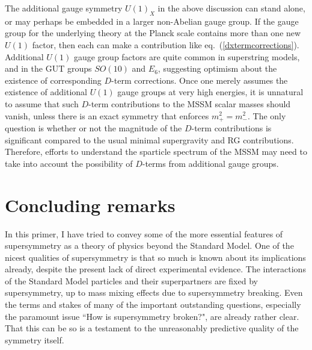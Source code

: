 \documentclass[12pt]{article}
\begin{document}
The additional gauge symmetry $U(1)_X$ in the above discussion can stand
alone, or may perhaps be embedded in a larger non-Abelian gauge group. If
the gauge group for the underlying theory at the Planck scale contains
more than one new $U(1)$ factor, then each can make a contribution like
eq.~(\ref{dxtermcorrections}). Additional $U(1)$ gauge group 
factors are quite
common in superstring models, and in the GUT groups $SO(10)$ and $E_6$, 
suggesting optimism about the existence of
corresponding $D$-term corrections. Once one merely assumes the existence
of additional $U(1)$ gauge groups at very high energies, it is unnatural
to assume that such $D$-term contributions to the MSSM scalar masses
should vanish, unless there is an exact symmetry that enforces $m_+^2 =
m_-^2$. The only question is whether or not the magnitude of the
$D$-term contributions is significant compared to the usual minimal
supergravity and RG contributions. Therefore, efforts to
understand the sparticle spectrum of the MSSM may need to take into
account the possibility of $D$-terms from additional gauge groups. 

\section{Concluding remarks}\label{sec:outlook}
\setcounter{equation}{0}
\setcounter{figure}{0}
\setcounter{table}{0}
\setcounter{footnote}{1}

In this primer, I have tried to convey some of the more essential 
features of supersymmetry as a theory of physics beyond the Standard Model. 
One of the nicest qualities of supersymmetry is that so much is known 
about its implications already, despite the present lack of direct experimental evidence. 
The interactions of the Standard Model particles and their superpartners are 
fixed by supersymmetry, up to mass mixing effects due to supersymmetry 
breaking. Even the terms and stakes of many of the important outstanding 
questions, especially the paramount issue ``How is supersymmetry 
broken?", are already rather clear. That this can be so is a testament 
to the unreasonably predictive quality of the symmetry itself.
\end{document}
